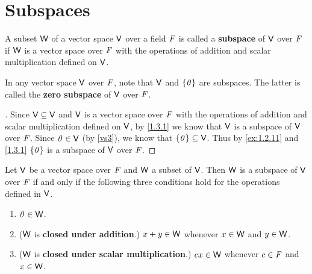 \section{Subspaces}\label{sec:1.3}

\begin{defn}\label{1.3.1}
  A subset \(\mathsf{W}\) of a vector space \(\mathsf{V}\) over a field \(\mathit{F}\) is called a \textbf{subspace} of \(\mathsf{V}\) over \(\mathit{F}\) if \(\mathsf{W}\) is a vector space over \(\mathit{F}\) with the operations of addition and scalar multiplication defined on \(\mathsf{V}\).
\end{defn}

\begin{eg}\label{1.3.2}
  In any vector space \(\mathsf{V}\) over \(\mathit{F}\), note that \(\mathsf{V}\) and \(\left\lbrace\mathit{0}\right\rbrace\) are subspaces.
  The latter is called the \textbf{zero subspace} of \(\mathsf{V}\) over \(\mathit{F}\).
\end{eg}

\begin{proof}[]
  Since \(\mathsf{V} \subseteq \mathsf{V}\) and \(\mathsf{V}\) is a vector space over \(\mathit{F}\) with the operations of addition and scalar multiplication defined on \(\mathsf{V}\), by \cref{1.3.1} we know that \(\mathsf{V}\) is a subspace of \(\mathsf{V}\) over \(\mathit{F}\).
  Since \(\mathit{0} \in \mathsf{V}\) (by \ref{vs3}), we know that \(\left\lbrace\mathit{0}\right\rbrace \subseteq \mathsf{V}\).
  Thus by \cref{ex:1.2.11} and \cref{1.3.1} \(\left\lbrace\mathit{0}\right\rbrace\) is a subspace of \(\mathsf{V}\) over \(\mathit{F}\).
\end{proof}

\begin{thm}\label{1.3}
  Let \(\mathsf{V}\) be a vector space over \(\mathit{F}\) and \(\mathsf{W}\) a subset of \(\mathsf{V}\).
  Then \(\mathsf{W}\) is a subspace of \(\mathsf{V}\) over \(\mathit{F}\) if and only if the following three conditions hold for the operations defined in \(\mathsf{V}\).
  \begin{enumerate}
    \item \(\mathit{0} \in \mathsf{W}\).
    \item (\(\mathsf{W}\) is \textbf{closed under addition}.)
          \(x + y \in \mathsf{W}\) whenever \(x \in \mathsf{W}\) and \(y \in \mathsf{W}\).
    \item (\(\mathsf{W}\) is \textbf{closed under scalar multiplication}.)
          \(cx \in \mathsf{W}\) whenever \(c \in \mathit{F}\) and \(x \in \mathsf{W}\).
  \end{enumerate}
\end{thm}

